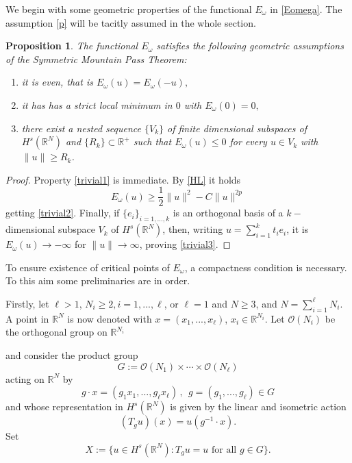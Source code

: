 \documentclass[10pt]{amsart}
\numberwithin{equation}{section}
\newtheorem{proposition}[theorem]{Proposition}
\begin{document}
\noindent
We begin with some geometric properties of the functional $E_{\omega}$ in \eqref{Eomega}.
The assumption \eqref{p}  will be tacitly assumed in the whole section. 
\begin{proposition}\label{TRIVIAL}
The functional $E_{\omega}$ satisfies the following geometric assumptions of the Symmetric Mountain Pass Theorem:
\begin{enumerate}[label=(\roman*),ref=\roman*]
\item \label{trivial1} it is even, that is $E_{\omega}(u)=E_{\omega}(-u),$
\item \label{trivial2} it has has a strict local minimum in $0$ with $E_{\omega}(0)=0,$
\item \label{trivial3} there exist a nested sequence $\{V_k\}$ of finite dimensional subspaces of $H^s({{\mathbb R}}^N)$ and $\{R_k\}\subset {{\mathbb R}}^+$
such  that $E_\omega(u)\leq 0$ for every $u\in V_k$ with $\|u\|\geq R_k$.
\end{enumerate}
 \end{proposition}
 \begin{proof}
 
Property  \eqref{trivial1} is immediate. By \eqref{HL} it holds
$$
E_{\omega}(u)\geq \frac{1}{2} \|u\|^{2}- C\|u\|^{2p}
$$
getting \eqref{trivial2}.
Finally,  if $\{e_{i}\}_{i=1,..., k}$ is an orthogonal basis of a $k-$dimensional subspace $V_{k}$ of ${H^{s}(\mathbb R^{N})}$,
 then,  
writing  $u=\sum_{i=1}^{k}t_{i}e_{i}$, it is $E_{\omega}(u)\to -\infty$
for $\|u\|\to\infty$, proving \eqref{trivial3}.
\end{proof}
\noindent
To ensure existence of critical points of $E_{\omega}$,  a compactness condition is necessary.
To this aim some preliminaries are in order.

\medskip

\noindent
Firstly, let $\ell >1$, $N_{i}\geq2, i=1,...,\ell $,  or $\ell=1$ and $N\geq3$, and $N=\sum_{i=1}^{\ell }N_{i}$. A point in $\mathbb R^{N}$
is now denoted with $x=(x_{1},...,x_{\ell })$, $x_{i}\in \mathbb R^{N_{i}}.$
Let ${{\mathscr O}}(N_{i})$ be the orthogonal group on $\mathbb R^{N_{i}}$
 
and consider the product group  $$G:={{\mathscr O}}(N_{1})\times\cdots\times {{\mathscr O}}(N_{\ell })$$
acting on $\mathbb R^{N}$ by
$$g \cdot x= (g_{1}x_{1},...,g_{\ell }x_{\ell })\,, \ \ g=(g_{1},...,g_{\ell })\in G$$
and whose representation in ${H^{s}(\mathbb R^{N})}$ is given by the linear and isometric action 
\begin{equation}\label{action}
(T_{g}u)(x)=u(g^{-1} \cdot x).
\end{equation}
Set $$X:=\{u\in {H^{s}(\mathbb R^{N})}: T_{g}u=u \text{ for all } g\in G\}.$$
\end{document}
